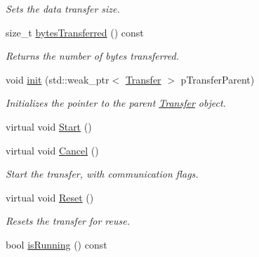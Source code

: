 \begin{DoxyCompactItemize}
\begin{DoxyCompactList}\small\item\em Sets the data transfer size. \end{DoxyCompactList}\item 
\hypertarget{class_lib_u_s_b_1_1_transfer_impl_afda763caf4ebfbe671b2918e8b2f2837}{size\-\_\-t \hyperlink{class_lib_u_s_b_1_1_transfer_impl_afda763caf4ebfbe671b2918e8b2f2837}{bytes\-Transferred} () const }\label{class_lib_u_s_b_1_1_transfer_impl_afda763caf4ebfbe671b2918e8b2f2837}

\begin{DoxyCompactList}\small\item\em Returns the number of bytes transferred. \end{DoxyCompactList}\item 
\hypertarget{class_lib_u_s_b_1_1_transfer_impl_a3f21548633b419cbabd9b688ee4158c2}{void \hyperlink{class_lib_u_s_b_1_1_transfer_impl_a3f21548633b419cbabd9b688ee4158c2}{init} (std\-::weak\-\_\-ptr$<$ \hyperlink{class_lib_u_s_b_1_1_transfer}{Transfer} $>$ p\-Transfer\-Parent)}\label{class_lib_u_s_b_1_1_transfer_impl_a3f21548633b419cbabd9b688ee4158c2}

\begin{DoxyCompactList}\small\item\em Initializes the pointer to the parent \hyperlink{class_lib_u_s_b_1_1_transfer}{Transfer} object. \end{DoxyCompactList}\item 
virtual void \hyperlink{class_lib_u_s_b_1_1_transfer_impl_a681db4685c4d332d89197bf8f8e7a475}{Start} ()
\item 
virtual void \hyperlink{class_lib_u_s_b_1_1_transfer_impl_a8cf0e98b071bea590bce1a6b21b42653}{Cancel} ()
\begin{DoxyCompactList}\small\item\em Start the transfer, with communication flags. \end{DoxyCompactList}\item 
\hypertarget{class_lib_u_s_b_1_1_transfer_impl_af3aaf7fb8c9fa1e42dc3f6b4d895ade7}{virtual void \hyperlink{class_lib_u_s_b_1_1_transfer_impl_af3aaf7fb8c9fa1e42dc3f6b4d895ade7}{Reset} ()}\label{class_lib_u_s_b_1_1_transfer_impl_af3aaf7fb8c9fa1e42dc3f6b4d895ade7}

\begin{DoxyCompactList}\small\item\em Resets the transfer for reuse. \end{DoxyCompactList}\item 
\hypertarget{class_lib_u_s_b_1_1_transfer_impl_a513bfb1ebc75a295d9db444c991a62b0}{bool \hyperlink{class_lib_u_s_b_1_1_transfer_impl_a513bfb1ebc75a295d9db444c991a62b0}{is\-Running} () const }\label{class_lib_u_s_b_1_1_transfer_impl_a513bfb1ebc75a295d9db444c991a62b0}


\end{DoxyCompactItemize}
